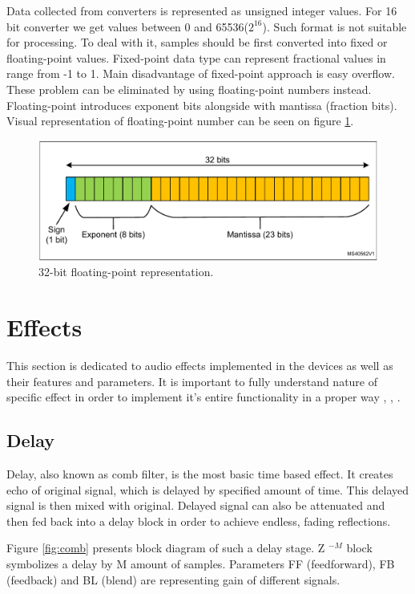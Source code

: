 \documentclass[a4paper,twoside,12pt]{book}
\begin{document}
Data collected from converters is represented as unsigned integer values.
For 16 bit converter we get values between 0 and 65536(\(2^{16}\)).
Such format is not suitable for processing.
To deal with it, samples should be first converted into fixed or floating-point values.
Fixed-point data type can represent fractional values in range from -1 to 1.
Main disadvantage of fixed-point approach is easy overflow.
These problem can be eliminated by using floating-point numbers instead.
Floating-point introduces exponent bits alongside with mantissa (fraction bits).
Visual representation of floating-point number can be seen on figure \ref{fig:Float}.

\begin{figure}[H]
    \centering
    \includegraphics[width=\textwidth]{images/float}
    \caption{32-bit floating-point representation\cite{ST:DSP}.}
    \label{fig:Float}
\end{figure}

\section{Effects}
This section is dedicated to audio effects implemented in the devices
as well as their features and parameters.
It is important to fully understand nature of specific effect
in order to implement it's entire functionality in a proper way
\cite{Zolzer1},
\cite{Zolzer2},
\cite{Smith}.

\subsection{Delay}
Delay, also known as comb filter, is the most basic time based effect.
It creates echo of original signal,
which is delayed by specified amount of time.
This delayed signal is then mixed with original.
Delayed signal can also be attenuated and then fed back into a delay block
in order to achieve endless, fading reflections.

Figure \ref{fig:comb} presents block diagram of such a delay stage.
Z \(^{-M}\) block symbolizes a delay by M amount of samples.
Parameters FF (feedforward), FB (feedback) and BL (blend)
are representing gain of different signals.
\end{document}
